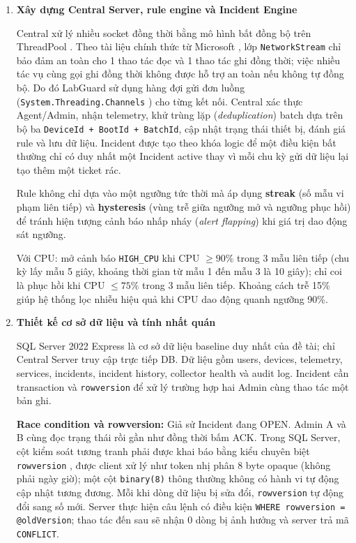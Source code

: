 \begin{enumerate}
    \item \textbf{Xây dựng Central Server, rule engine và Incident Engine}

    Central xử lý nhiều socket đồng thời bằng mô hình bất đồng bộ trên ThreadPool \cite{mslearn_sockets}. Theo tài liệu chính thức từ Microsoft \cite{mslearn_networkstream}, lớp \texttt{NetworkStream} chỉ bảo đảm an toàn cho 1 thao tác đọc và 1 thao tác ghi đồng thời; việc nhiều tác vụ cùng gọi ghi đồng thời không được hỗ trợ an toàn nếu không tự đồng bộ. Do đó LabGuard sử dụng hàng đợi gửi đơn luồng (\texttt{System.Threading.Channels} \cite{mslearn_channels}) cho từng kết nối. Central xác thực Agent/Admin, nhận telemetry, khử trùng lặp (\textit{deduplication}) batch dựa trên bộ ba \texttt{DeviceId + BootId + BatchId}, cập nhật trạng thái thiết bị, đánh giá rule và lưu dữ liệu. Incident được tạo theo khóa logic để một điều kiện bất thường chỉ có duy nhất một Incident active thay vì mỗi chu kỳ gửi dữ liệu lại tạo thêm một ticket rác.

    Rule không chỉ dựa vào một ngưỡng tức thời mà áp dụng \textbf{streak} (số mẫu vi phạm liên tiếp) và \textbf{hysteresis} (vùng trễ giữa ngưỡng mở và ngưỡng phục hồi) để tránh hiện tượng cảnh báo nhấp nháy (\textit{alert flapping}) khi giá trị dao động sát ngưỡng.

    \begin{examplebox}
    Với CPU: mở cảnh báo \texttt{HIGH\_CPU} khi CPU $\geq 90\%$ trong 3 mẫu liên tiếp (chu kỳ lấy mẫu 5 giây, khoảng thời gian từ mẫu 1 đến mẫu 3 là 10 giây); chỉ coi là phục hồi khi CPU $\leq 75\%$ trong 3 mẫu liên tiếp. Khoảng cách trễ 15\% giúp hệ thống lọc nhiễu hiệu quả khi CPU dao động quanh ngưỡng 90\%.
    \end{examplebox}

    \item \textbf{Thiết kế cơ sở dữ liệu và tính nhất quán}

    SQL Server 2022 Express là cơ sở dữ liệu baseline duy nhất của đề tài; chỉ Central Server truy cập trực tiếp DB. Dữ liệu gồm users, devices, telemetry, services, incidents, incident history, collector health và audit log. Incident cần transaction và \texttt{rowversion} để xử lý trường hợp hai Admin cùng thao tác một bản ghi.

    \begin{beginnerbox}
    \textbf{Race condition và rowversion:} Giả sử Incident đang OPEN. Admin A và B cùng đọc trạng thái rồi gần như đồng thời bấm ACK. Trong SQL Server, cột kiểm soát tương tranh phải được khai báo bằng kiểu chuyên biệt \texttt{rowversion} \cite{mslearn_rowversion}, được client xử lý như token nhị phân 8 byte opaque (không phải ngày giờ); một cột \texttt{binary(8)} thông thường không có hành vi tự động cập nhật tương đương. Mỗi khi dòng dữ liệu bị sửa đổi, \texttt{rowversion} tự động đổi sang số mới. Server thực hiện câu lệnh có điều kiện \texttt{WHERE rowversion = @oldVersion}; thao tác đến sau sẽ nhận 0 dòng bị ảnh hưởng và server trả mã \texttt{CONFLICT}.
    \end{beginnerbox}


\end{enumerate}
